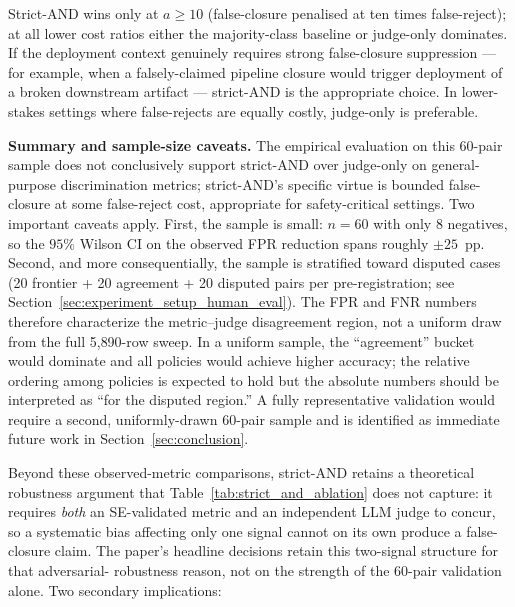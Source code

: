 Strict-AND wins only at $a \geq 10$ (false-closure penalised at ten
times false-reject); at all lower cost ratios either the majority-class
baseline or judge-only dominates. If the deployment context genuinely
requires strong false-closure suppression --- for example, when a
falsely-claimed pipeline closure would trigger deployment of a broken
downstream artifact --- strict-AND is the appropriate choice. In lower-
stakes settings where false-rejects are equally costly, judge-only is
preferable.

\textbf{Summary and sample-size caveats.} The empirical evaluation on
this 60-pair sample does not conclusively support strict-AND over
judge-only on general-purpose discrimination metrics; strict-AND's
specific virtue is bounded false-closure at some false-reject cost,
appropriate for safety-critical settings. Two important caveats apply.
First, the sample is small: $n = 60$ with only $8$ negatives, so the
$95\%$ Wilson CI on the observed FPR reduction spans roughly
$\pm 25$~pp. Second, and more consequentially, the sample is
stratified toward disputed cases (20 frontier + 20 agreement + 20
disputed pairs per pre-registration; see
Section~\ref{sec:experiment_setup_human_eval}). The FPR and FNR
numbers therefore characterize the metric--judge disagreement region,
not a uniform draw from the full 5{,}890-row sweep. In a uniform
sample, the ``agreement'' bucket would dominate and all policies
would achieve higher accuracy; the relative ordering among policies
is expected to hold but the absolute numbers should be interpreted as
``for the disputed region.'' A fully representative validation would
require a second, uniformly-drawn 60-pair sample and is identified as
immediate future work in Section~\ref{sec:conclusion}.

Beyond these observed-metric comparisons, strict-AND retains a
theoretical robustness argument that Table~\ref{tab:strict_and_ablation}
does not capture: it requires \emph{both} an SE-validated metric and
an independent LLM judge to concur, so a systematic bias affecting only
one signal cannot on its own produce a false-closure claim. The paper's
headline decisions retain this two-signal structure for that adversarial-
robustness reason, not on the strength of the $60$-pair validation
alone.
Two secondary implications:

